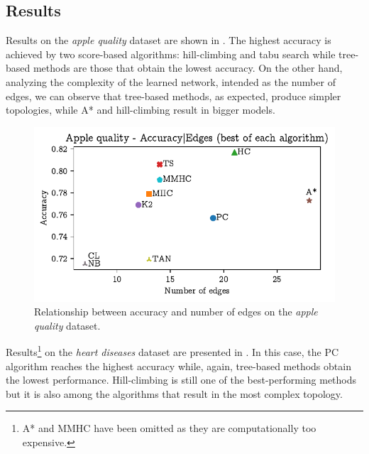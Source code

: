 \documentclass[letterpaper]{article}
\begin{document}

\subsection{Results}

Results on the \textit{apple quality} dataset are shown in .
The highest accuracy is achieved by two score-based algorithms: hill-climbing and tabu search
while tree-based methods are those that obtain the lowest accuracy.
On the other hand, analyzing the complexity of the learned network, intended as the number of edges,
we can observe that tree-based methods, as expected, produce simpler topologies, while A* and hill-climbing result in bigger models.

\begin{figure}[h]
    \centering
    \includegraphics[width=\linewidth]{img/apple_acc_edges.pdf}
    \caption{Relationship between accuracy and number of edges on the \textit{apple quality} dataset.}
    \label{img:apple}
\end{figure}

Results\footnote{A* and MMHC have been omitted as they are computationally too expensive.} 
on the \textit{heart diseases} dataset are presented in .
In this case, the PC algorithm reaches the highest accuracy while, again, tree-based methods obtain the lowest performance.
Hill-climbing is still one of the best-performing methods but 
it is also among the algorithms that result in the most complex topology.
\end{document}
